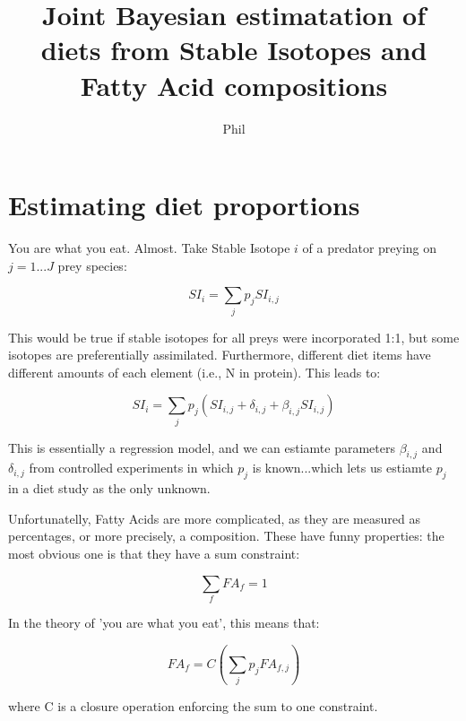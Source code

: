\documentclass{beamer}\usepackage[]{graphicx}\usepackage[]{color}
\begin{document}
\title{Joint Bayesian estimatation of diets from Stable Isotopes and Fatty Acid compositions}
\author{Phil}

\frame{\titlepage} %

\section{Estimating diet proportions}


\begin{frame}

You are what you eat. Almost. Take Stable Isotope $i$ of a predator preying on $j=1...J$ prey species:

\[
  SI_{i}=\sum_{j} p_j SI_{i,j}
\]

This would be true if stable isotopes for all preys were incorporated 1:1, but some isotopes are preferentially assimilated. Furthermore, different diet items have different amounts of each element (i.e., N in protein). This leads to:

\[
  SI_{i}=\sum_{j} p_j (SI_{i,j} + \delta_{i,j} + \beta_{i,j} SI_{i,j})
\]

\end{frame}

\begin{frame}

This is essentially a regression model, and we can estiamte parameters $\beta_{i,j}$ and $\delta_{i,j}$ from controlled experiments in which $p_j$ is known...which lets us estiamte $p_j$ in a diet study as the only unknown.\\

\quad

Unfortunatelly, Fatty Acids are more complicated, as they are measured as percentages, or more precisely, a composition. These have funny properties: the most obvious one is that they have a sum constraint: 

\[
  \sum_f FA_f = 1
\]


\end{frame}

\begin{frame}

In the theory of 'you are what you eat', this means that:

\[
  FA_{f}=C(\sum_{j} p_j FA_{f,j})
\]

where C is a closure operation enforcing the sum to one constraint.\\

\end{frame}
\end{document}
